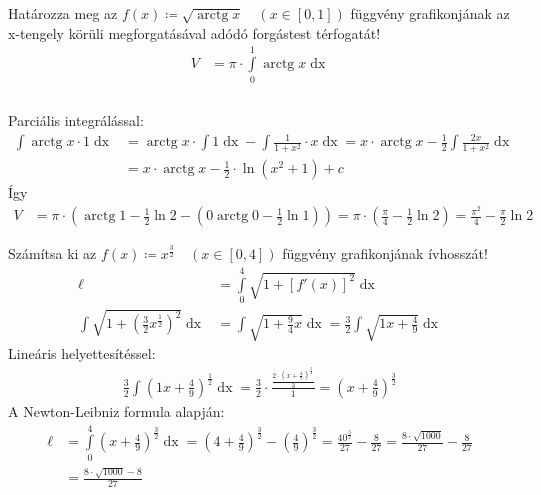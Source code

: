 \documentclass[a4paper,12pt]{article}
\theoremstyle{definition}
\DeclareMathOperator{\arctg}{arctg}
\begin{document}
	\newpage
	\begin{question}
		Határozza meg az $f(x) \coloneq \sqrt{\arctg{x}} \quad \left(x \in \left[0,1\right]\right) $ függvény grafikonjának az x-tengely körüli megforgatásával adódó forgástest térfogatát!
		\begin{align*}
			V &= \pi \cdot \int\limits_{0}^{1}{\arctg x \mathop{dx}} \\
		\end{align*}
		\\[-45pt]
		Parciális integrálással:
		\begin{align*}
			\int{\arctg x \cdot 1 \mathop{dx}} &= \arctg x \cdot \int{1 \mathop{dx}} - \int{\frac{1}{1+x^2} \cdot x \mathop{dx}} = x \cdot \arctg x - \frac{1}{2} \int{\frac{2x}{1+x^2} \mathop{dx}} \\
			&= x \cdot \arctg x - \frac{1}{2} \cdot \ln(x^2+1) + c
		\end{align*}
		Így
		\begin{align*}
			V &= \pi \cdot \left( \arctg 1 - \frac{1}{2} \ln 2 - \left(0 \arctg 0 - \frac{1}{2} \ln 1\right) \right) = \pi \cdot \left( \frac{\pi}{4} - \frac{1}{2} \ln2 \right) = \frac{\pi^2}{4} - \frac{\pi}{2} \ln 2
		\end{align*}
	\end{question}
	\begin{question}
		Számítsa ki az $f(x) \coloneq x^{\frac{3}{2}} \quad \left(x \in \left[0,4\right]\right) $ függvény grafikonjának ívhosszát!
		\begin{align*}
			\ell &= \int\limits_{0}^{4}{\sqrt{1+\left[ f'(x) \right]^2} \mathop{dx}} \\
			\int{\sqrt{1+  \left( \frac{3}{2} x^{\frac{1}{2}} \right)^2 } \mathop{dx} } &= \int{\sqrt{1 + \frac{9}{4} x} \mathop{dx} } = \frac{3}{2} \int{\sqrt{1x+\frac{4}{9}} \mathop{dx} }
		\end{align*}
		Lineáris helyettesítéssel:
		\begin{align*}
			\frac{3}{2} \int{\left( {1x+\frac{4}{9}}\right)^\frac{1}{2} \mathop{dx} } = \frac{3}{2} \cdot \frac{\frac{2 \cdot \left(x + \frac{4}{9}\right)^\frac{3}{2}}{3}}{1} = \left(x + \frac{4}{9}\right)^\frac{3}{2}
		\end{align*}
		A Newton-Leibniz formula alapján:
		\begin{align*}
			\ell &= \int\limits_{0}^{4}{\left(x + \frac{4}{9}\right)^\frac{3}{2} \mathop{dx}} = \left(4 + \frac{4}{9}\right)^\frac{3}{2} - \left(\frac{4}{9}\right)^\frac{3}{2} = \frac{40^\frac{3}{2}}{27} - \frac{8}{27} = \frac{8 \cdot \sqrt{1000}}{27} - \frac{8}{27} \\
			&= \frac{8 \cdot \sqrt{1000}-8}{27}
		\end{align*}
	\end{question}
\end{document}
